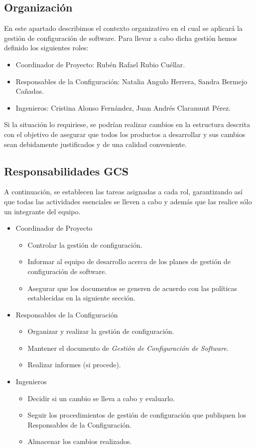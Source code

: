 \documentclass[11pt, a4paper, twoside, titlepage]{article}
\begin{document}
		\subsection{Organización}
			En este apartado describimos el contexto organizativo en el cual se aplicará la gestión de configuración de software. Para llevar a cabo dicha gestión hemos definido los siguientes roles:

			\begin{itemize}
				\item Coordinador de Proyecto: Rubén Rafael Rubio Cuéllar.
				\item Responsables de la Configuración: Natalia Angulo Herrera, Sandra Bermejo Cañadas.
				\item Ingenieros: Cristina Alonso Fernández, Juan Andrés Claramunt Pérez.
			\end{itemize}

			Si la situación lo requiriese, se podrían realizar cambios en la estructura descrita con el objetivo de asegurar que todos los productos a desarrollar y sus cambios sean debidamente justificados y de una calidad conveniente.
		\subsection{Responsabilidades GCS}
			A continuación, se establecen las tareas asignadas a cada rol, garantizando así que todas las actividades esenciales se lleven a cabo y además que las realice sólo un integrante del equipo.
			\begin{itemize}
				\item Coordinador de Proyecto
					\begin{itemize}
						\item Controlar la gestión de configuración.
						\item Informar al equipo de desarrollo acerca de los planes de gestión de configuración de software.
						\item Asegurar que los documentos se generen de acuerdo con las políticas establecidas en la siguiente sección.
					\end{itemize}
				\item Responsables de la Configuración
					\begin{itemize}
						\item Organizar y realizar la gestión de configuración.
						\item Mantener el documento de \textit{Gestión de Configuración de Software}.
						\item Realizar informes (si procede).
					\end{itemize}
				\item Ingenieros
					\begin{itemize}
						\item Decidir si un cambio se lleva a cabo y evaluarlo.
						\item Seguir los procedimientos de gestión de configuración que publiquen los Responsables de la Configuración.
						\item Almacenar los cambios realizados.
					\end{itemize}
			\end{itemize}
\end{document}
